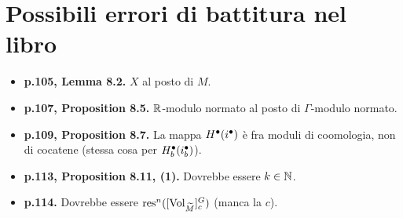 \section*{Possibili errori di battitura nel libro} 
\begin{itemize}
\item \textbf{p.105, Lemma 8.2.} $X$ al posto di $M$.
\item \textbf{p.107, Proposition 8.5.} $\mathbb{R}$-modulo normato al posto di $\Gamma$-modulo normato.
\item \textbf{p.109, Proposition 8.7.} La mappa $H^\bullet(i^\bullet)$ è fra moduli di coomologia, non di cocatene (stessa cosa per $H^\bullet_b(i^\bullet_b)$).
\item \textbf{p.113, Proposition 8.11, (1).} Dovrebbe essere $k\in\mathbb{N}$.
\item \textbf{p.114.} Dovrebbe essere $\operatorname{res}^n([\operatorname{Vol}_{\widetilde M}]^G_c)$ (manca la $c$).
\end{itemize}